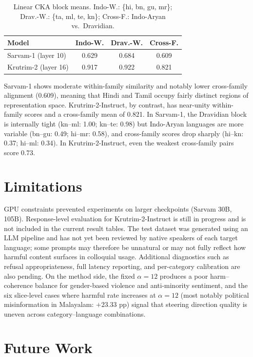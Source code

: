 \documentclass[11pt]{article}
\begin{document}
\begin{table}[t]
\small
\centering
\begin{tabular}{lccc}
\toprule
Model & Indo-W. & Drav.-W. & Cross-F. \\
\midrule
Sarvam-1 (layer 10) & 0.629 & 0.684 & 0.609 \\
Krutrim-2 (layer 16) & 0.917 & 0.922 & 0.821 \\
\bottomrule
\end{tabular}
\caption{Linear CKA block means. Indo-W.: \{hi, bn, gu, mr\}; Drav.-W.: \{ta, ml, te, kn\}; Cross-F.: Indo-Aryan vs.\ Dravidian.}
\label{tab:cka-blocks}
\end{table}

Sarvam-1 shows moderate within-family similarity and notably lower cross-family alignment (0.609), meaning that Hindi and Tamil occupy fairly distinct regions of representation space. Krutrim-2-Instruct, by contrast, has near-unity within-family scores and a cross-family mean of 0.821. In Sarvam-1, the Dravidian block is internally tight (kn--ml: 1.00; kn--te: 0.98) but Indo-Aryan languages are more variable (bn--gu: 0.49; hi--mr: 0.58), and cross-family scores drop sharply (hi--kn: 0.37; hi--ml: 0.34). In Krutrim-2-Instruct, even the weakest cross-family pairs score 0.73.

\section{Limitations}

GPU constraints prevented experiments on larger checkpoints (Sarvam 30B, 105B). Response-level evaluation for Krutrim-2-Instruct is still in progress and is not included in the current result tables. The test dataset was generated using an LLM pipeline and has not yet been reviewed by native speakers of each target language; some prompts may therefore be unnatural or may not fully reflect how harmful content surfaces in colloquial usage. Additional diagnostics such as refusal appropriateness, full latency reporting, and per-category calibration are also pending. On the method side, the fixed $\alpha=12$ produces a poor harm--coherence balance for gender-based violence and anti-minority sentiment, and the six slice-level cases where harmful rate increases at $\alpha=12$ (most notably political misinformation in Malayalam: $+23.33$ pp) signal that steering direction quality is uneven across category--language combinations.

\section{Future Work}
\end{document}
